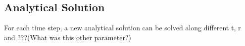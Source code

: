 		
\subsection{Analytical Solution}
	For each time step, a new analytical solution can be solved along different t, r and ???(What was this other parameter?)
	

	

